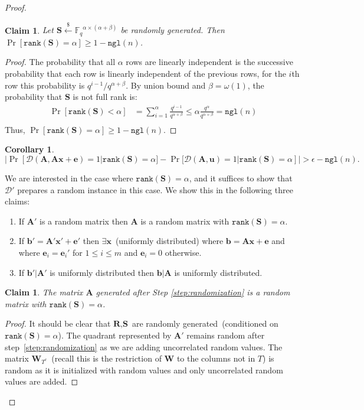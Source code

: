 \documentclass[11pt]{article}
\newcommand{\vect}[1]{\ensuremath{\textbf{#1}}}
\newcommand{\Fq}{\ensuremath{\mathbb{F}_q}}
\newcommand{\D}{\mathcal{D}}
\newcommand{\rank}{\ensuremath{\mathtt{rank}}\xspace}
\newcommand{\ngl}{\ensuremath{\mathtt{ngl}}\xspace}
\newtheorem{corollary}[theorem]{Corollary}
\newtheorem{claim}[theorem]{Claim}
\newcommand{\authnote}[2]{{\textcolor{red}{\textsf{#1 notes: }\textcolor{blue}{ #2}}\marginpar{\textcolor{red}{\textbf{!!!!!}}}}}
\newcommand{\authnote}[2]{}
\newcommand{\bnote}[1]{{\authnote{Ben}{#1}}}
\newcommand{\ve}{\vect{e}}
\newcommand{\vS}{\vect{S}}
\newcommand{\vA}{\vect{A}}
\newcommand{\vW}{\vect{W}}
\newcommand{\vR}{\vect{R}}
\newcommand{\vx}{\vect{x}}
\newcommand{\vb}{\vect{b}}
\newcommand{\vu}{\vect{u}}
\begin{document}
\begin{proof}
\begin{claim}
\label{cl:full rank matrix}
Let $\vS \overset{\$}\leftarrow \Fq^{\alpha \times (\alpha+\beta)}$ be randomly generated.  Then $\Pr[\rank(\vS)=\alpha]\geq  1- \ngl(n)$.
\end{claim}
\begin{proof}
The probability that all $\alpha$ rows are linearly independent is the successive probability that each row is linearly independent of the previous rows, for the $i$th row this probability is $q^{i-1}/q^{\alpha+\beta}$.  By union bound and $\beta = \omega(1)$, the probability that $\vS$ is not full rank is:
\begin{align*}
\Pr[\rank(\vS) < \alpha] &= \sum_{i=1}^{\alpha} \frac{q^{i-1}}{q^{\alpha+\beta}}
\leq \alpha \frac{q^{\alpha}}{q^{\alpha+\beta} }=\ngl(n)\\
\end{align*}
Thus, $\Pr[\rank(\vS) = \alpha] \geq 1-\ngl(n)$.
\end{proof}
\begin{corollary}
$
|\Pr[\D(\vA, \vA\vx+\ve) = 1  | \rank(\vS) = \alpha] - \Pr[\D(\vA, \vu) =1 | \rank(\vS) = \alpha]|> \epsilon - \ngl(n).
$
\end{corollary}

We are interested in the case where $\rank(\vS) = \alpha$, and it suffices to show that $\D'$ prepares a random instance in this case. We show this in the following three claims: 
\begin{enumerate}
\item If $\vA'$ is a random matrix then $\vA$ is a random matrix with $\rank(\vS) = \alpha$.
\item If $\vb' = \vA'\vx'+\ve'$ then $\exists \vx$~(uniformly distributed) where $\vb = \vA \vx + \ve$ and where $\ve_i = \ve_i'$ for $1\leq i\leq m$ and $\ve_i = 0$ otherwise.
\item If $\vb' | \vA'$ is uniformly distributed then $\vb | \vA$ is uniformly distributed.
\end{enumerate}

\begin{claim}
\label{cl:randomMatrixDist}
The matrix $\vA$ generated after Step \ref{step:randomization} is a random matrix with $\rank(\vS) = \alpha$.
\end{claim}
\begin{proof}
It should be clear that $\vR, \vS$ are randomly generated~(conditioned on $\rank(\vS) =\alpha$).  The quadrant represented by $\vA'$ remains random after step~\ref{step:randomization} as we are adding uncorrelated random values.  
The matrix $\vW_{T^c}$~(recall this is the restriction of $\vW$ to the columns not in $T$) is random as it is initialized with random values and only uncorrelated random values are added.


\end{proof}
\end{proof}
\end{document}

